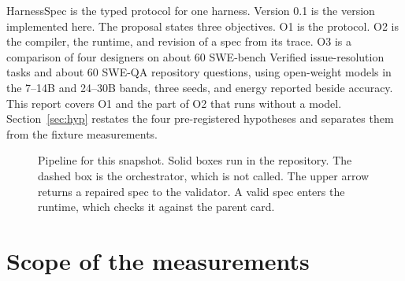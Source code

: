 \documentclass[10pt,a4paper]{article}
\begin{document}
HarnessSpec is the typed protocol for one harness. Version 0.1 is the version implemented here. The proposal states three objectives. O1 is the protocol. O2 is the compiler, the runtime, and revision of a spec from its trace. O3 is a comparison of four designers on about 60 SWE-bench Verified issue-resolution tasks and about 60 SWE-QA repository questions, using open-weight models in the 7--14B and 24--30B bands, three seeds, and energy reported beside accuracy. This report covers O1 and the part of O2 that runs without a model. Section~\ref{sec:hyp} restates the four pre-registered hypotheses and separates them from the fixture measurements.

\begin{figure}[H]
\centering
{}
\caption{Pipeline for this snapshot. Solid boxes run in the repository. The dashed box is the orchestrator, which is not called. The upper arrow returns a repaired spec to the validator. A valid spec enters the runtime, which checks it against the parent card.}
\label{fig:pipeline}
\end{figure}

\section{Scope of the measurements}
\label{sec:scope}
\end{document}
